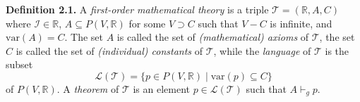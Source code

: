 \textbf{Definition 2.1.} A \textit{first-order mathematical theory} is a triple $\mathcal{T} = (\mathbb{R}, A, C)$ where $\mathcal{I} \in \mathbb{R}$, $A \subseteq P(V, \mathbb{R})$ for some $V \supset C$ such that $V - C$ is infinite, and $\text{var}(A) = C$. The set $A$ is called the set of \textit{(mathematical) axioms} of $\mathcal{T}$, the set $C$ is called the set of \textit{(individual) constants} of $\mathcal{T}$, while the \textit{language} of $\mathcal{T}$ is the subset
\[
\mathcal{L}(\mathcal{T}) = \{p \in P(V, \mathbb{R}) \mid \text{var}(p) \subseteq C\}
\]
of $P(V, \mathbb{R})$. A \textit{theorem} of $\mathcal{T}$ is an element $p \in \mathcal{L}(\mathcal{T})$ such that $A \vdash_g p$.
